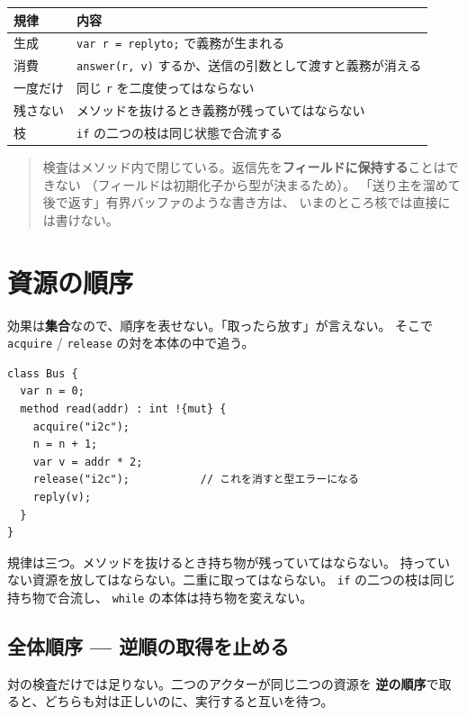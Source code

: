 \documentclass[11pt,a4paper]{ltjsarticle}
\begin{document}
\begin{center}
\small
\begin{tabular}{@{}lp{7.6cm}@{}}
\toprule
規律 & 内容 \\
\midrule
生成 & \texttt{var r = replyto;} で義務が生まれる \\
消費 & \texttt{answer(r, v)} するか、送信の引数として渡すと義務が消える \\
一度だけ & 同じ \texttt{r} を二度使ってはならない \\
残さない & メソッドを抜けるとき義務が残っていてはならない \\
枝 & \texttt{if} の二つの枝は同じ状態で合流する \\
\bottomrule
\end{tabular}
\end{center}

\begin{quote}\small
検査はメソッド内で閉じている。返信先を\textbf{フィールドに保持する}ことはできない
（フィールドは初期化子から型が決まるため）。
「送り主を溜めて後で返す」有界バッファのような書き方は、
いまのところ核では直接には書けない。
\end{quote}

\section{資源の順序}
\label{sec:resorder}

効果は\textbf{集合}なので、順序を表せない。「取ったら放す」が言えない。
そこで \texttt{acquire} / \texttt{release} の対を本体の中で追う。

\begin{lstlisting}
class Bus {
  var n = 0;
  method read(addr) : int !{mut} {
    acquire("i2c");
    n = n + 1;
    var v = addr * 2;
    release("i2c");           // これを消すと型エラーになる
    reply(v);
  }
}
\end{lstlisting}

規律は三つ。メソッドを抜けるとき持ち物が残っていてはならない。
持っていない資源を放してはならない。二重に取ってはならない。
\texttt{if} の二つの枝は同じ持ち物で合流し、
\texttt{while} の本体は持ち物を変えない。

\subsection{全体順序 --- 逆順の取得を止める}

対の検査だけでは足りない。二つのアクターが同じ二つの資源を
\textbf{逆の順序}で取ると、どちらも対は正しいのに、実行すると互いを待つ。
\end{document}
